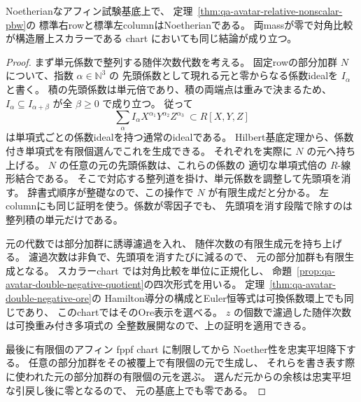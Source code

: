 \begin{corollary}[整列表示の相対Noether性]
\label{cor:qa-avatar-boundary-relative-noetherian}
Noetherianなアフィン試験基底上で、
定理~\ref{thm:qa-avatar-relative-nonscalar-pbw}の
標準右rowと標準左columnはNoetherianである。
両massが零で対角比較が構造層上スカラーである
chart においても同じ結論が成り立つ。
\end{corollary}
\begin{proof}
まず単元係数で整列する随伴次数代数を考える。
固定rowの部分加群 $N$ について、指数 $\alpha\in\mathbb N^3$ の
先頭係数として現れる元と零からなる係数idealを $I_\alpha$ と書く。
積の先頭係数は単元倍であり、積の両端点は重みで決まるため、
$I_\alpha\subseteq I_{\alpha+\beta}$ が全 $\beta\geq0$ で成り立つ。
従って
\[
 \sum_\alpha I_\alpha X^{\alpha_1}Y^{\alpha_2}Z^{\alpha_3}
 \ \subset R[X,Y,Z]
\]
は単項式ごとの係数idealを持つ通常のidealである。
Hilbert基底定理から、係数付き単項式を有限個選んでこれを生成できる。
それぞれを実際に $N$ の元へ持ち上げる。
$N$ の任意の元の先頭係数は、これらの係数の
適切な単項式倍の $R$-線形結合である。
そこで対応する整列道を掛け、単元係数を調整して先頭項を消す。
辞書式順序が整礎なので、この操作で $N$ が有限生成だと分かる。
左columnにも同じ証明を使う。係数が零因子でも、
先頭項を消す段階で除すのは整列積の単元だけである。

元の代数では部分加群に誘導濾過を入れ、
随伴次数の有限生成元を持ち上げる。
濾過次数は非負で、先頭項を消すたびに減るので、
元の部分加群も有限生成となる。
スカラーchart では対角比較を単位に正規化し、
命題~\ref{prop:qa-avatar-double-negative-quotient}の四次形式を用いる。
定理~\ref{thm:qa-avatar-double-negative-ore}の
Hamilton導分の構成とEuler恒等式は可換係数環上でも同じであり、
このchartではそのOre表示を選べる。
$z$ の個数で濾過した随伴次数は可換重み付き多項式の
全整数展開なので、上の証明を適用できる。

最後に有限個のアフィン fppf chart に制限してから
Noether性を忠実平坦降下する。
任意の部分加群をその被覆上で有限個の元で生成し、
それらを書き表す際に使われた元の部分加群の有限個の元を選ぶ。
選んだ元からの余核は忠実平坦な引戻し後に零となるので、
元の基底上でも零である。
\end{proof}


